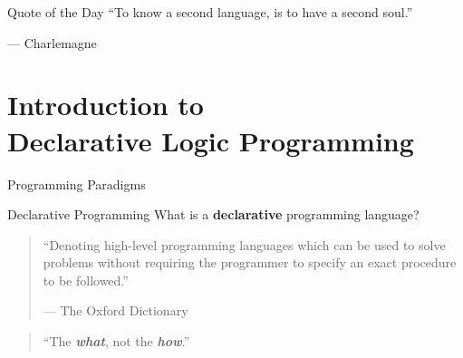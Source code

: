 \begin{frame}{Quote of the Day}
``To know a second language, is to have a second soul.''

\begin{flushright}
--- Charlemagne
\end{flushright}
\end{frame}



\section{Introduction to \\ Declarative Logic Programming}

\begin{frame}{Programming Paradigms}
\end{frame}

\begin{frame}{Declarative Programming}
What is a \textbf{declarative} programming language?

\bigskip

\begin{quote}
``Denoting high-level programming languages which can be used to solve problems
without requiring the programmer to specify an exact procedure to be followed.''
\begin{flushright}
--- The Oxford Dictionary
\end{flushright}
\end{quote}

\bigskip
\bigskip

\pause

\begin{quote}
\centering
\LARGE ``The \textbf{\emph{what}}, not the \textbf{\emph{how}}.''
\end{quote}
\end{frame}

